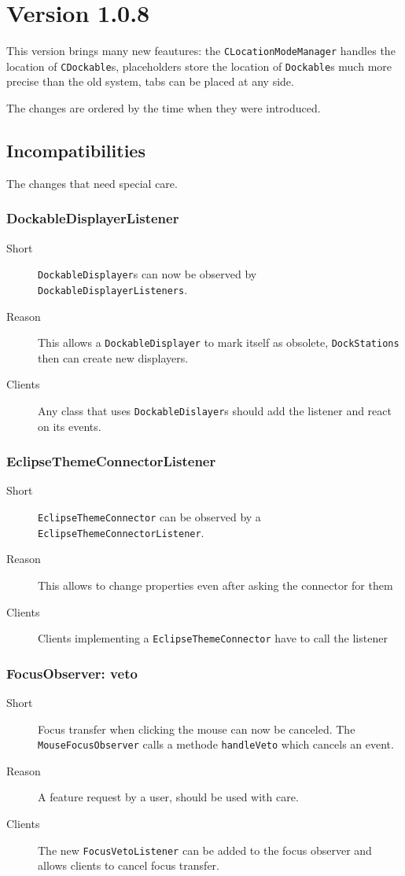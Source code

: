 \documentclass[a4paper,10pt]{article}
\newcommand{\src}[1]{\lstinline[basicstyle=\normalsize\ttfamily,keywordstyle=\normalsize\ttfamily,identifierstyle=\normalsize\ttfamily]|#1|}
\newcommand{\short}{\item[Short]}
\newcommand{\why}{\item[Reason]}
\newcommand{\clients}{\item[Clients]}
\begin{document}
\section{Version 1.0.8}
This version brings many new feautures: the \src{CLocationModeManager} handles the location of \src{CDockable}s, placeholders store the location of \src{Dockable}s much more precise than the old system, tabs can be placed at any side.

The changes are ordered by the time when they were introduced.

\subsection{Incompatibilities}
The changes that need special care.

\subsubsection{DockableDisplayerListener}
\begin{description}
 \short \src{DockableDisplayer}s can now be observed by \linebreak \src{DockableDisplayerListeners}.
 \why This allows a \src{DockableDisplayer} to mark itself as obsolete, \linebreak \src{DockStations} then can create new displayers.
 \clients Any class that uses \src{DockableDislayer}s should add the listener and react on its events.
\end{description}

\subsubsection{EclipseThemeConnectorListener}
\begin{description}
 \short \src{EclipseThemeConnector} can be observed by a \linebreak \src{EclipseThemeConnectorListener}.
 \why This allows to change properties even after asking the connector for them
 \clients Clients implementing a \src{EclipseThemeConnector} have to call the listener
\end{description}

\subsubsection{FocusObserver: veto}
\begin{description}
 \short Focus transfer when clicking the mouse can now be canceled. The \src{MouseFocusObserver} calls a methode \src{handleVeto} which cancels an event.
 \why A feature request by a user, should be used with care.
 \clients The new \src{FocusVetoListener} can be added to the focus observer and allows clients to cancel focus transfer.
\end{description}
\end{document}
